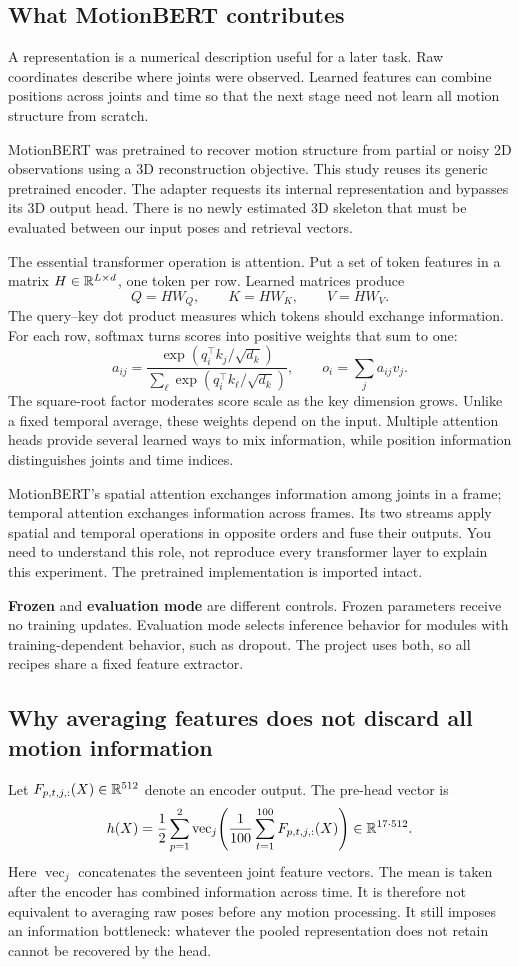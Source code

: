 \subsection{What MotionBERT contributes}
A representation is a numerical description useful for a later task. Raw
coordinates describe where joints were observed. Learned features can combine
positions across joints and time so that the next stage need not learn all
motion structure from scratch.

MotionBERT was pretrained to recover motion structure from partial or noisy 2D
observations using a 3D reconstruction objective. This study reuses its generic
pretrained encoder. The adapter requests its internal representation and bypasses
its 3D output head. There is no newly estimated 3D skeleton that must be evaluated
between our input poses and retrieval vectors.\cite{motionbert}

The essential transformer operation is attention. Put a set of token features
in a matrix $H\in\mathbb{R}^{L\times d}$, one token per row. Learned matrices produce
\[
 Q=HW_Q,\qquad K=HW_K,\qquad V=HW_V.
\]
The query--key dot product measures which tokens should exchange information.
For each row, softmax turns scores into positive weights that sum to one:
\[
 a_{ij}=\frac{\exp(q_i^\top k_j/\sqrt{d_k})}
 {\sum_\ell\exp(q_i^\top k_\ell/\sqrt{d_k})},
 \qquad o_i=\sum_j a_{ij}v_j.
\]
The square-root factor moderates score scale as the key dimension grows.
Unlike a fixed temporal average, these weights depend on the input. Multiple
attention heads provide several learned ways to mix information, while
position information distinguishes joints and time indices.

MotionBERT's spatial attention exchanges information among joints in a frame;
temporal attention exchanges information across frames. Its two streams apply
spatial and temporal operations in opposite orders and fuse their outputs.
You need to understand this role, not reproduce every transformer layer to
explain this experiment. The pretrained implementation is imported intact.

\textbf{Frozen} and \textbf{evaluation mode} are different controls. Frozen
parameters receive no training updates. Evaluation mode selects inference
behavior for modules with training-dependent behavior, such as dropout. The
project uses both, so all recipes share a fixed feature extractor.

\subsection{Why averaging features does not discard all motion information}
Let $F_{p,t,j,:}(X)\in\mathbb{R}^{512}$ denote an encoder output. The pre-head vector is
\[
 h(X)=\frac12\sum_{p=1}^{2}
       \operatorname{vec}_{j}\!\left(\frac1{100}
       \sum_{t=1}^{100}F_{p,t,j,:}(X)\right)\in\mathbb{R}^{17\cdot512}.
\]
Here $\operatorname{vec}_{j}$ concatenates the seventeen joint feature vectors.
The mean is taken after the encoder has combined information across time. It
is therefore not equivalent to averaging raw poses before any motion processing.
It still imposes an information bottleneck: whatever the pooled representation
does not retain cannot be recovered by the head.

